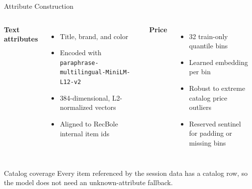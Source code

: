 \documentclass[10pt,aspectratio=169]{beamer}
\newcommand{\code}[1]{\texttt{#1}}
\begin{document}
\begin{frame}{Attribute Construction}
  \begin{columns}[T,onlytextwidth]
      \textbf{Text attributes}
      \begin{itemize}
        \item Title, brand, and color
        \item Encoded with \code{paraphrase-multilingual-MiniLM-L12-v2}
        \item 384-dimensional, L2-normalized vectors
        \item Aligned to RecBole internal item ids
      \end{itemize}

      \textbf{Price}
      \begin{itemize}
        \item 32 train-only quantile bins
        \item Learned embedding per bin
        \item Robust to extreme catalog price outliers
        \item Reserved sentinel for padding or missing bins
      \end{itemize}
  \end{columns}

  \vspace{0.8em}
  \begin{block}{Catalog coverage}
    Every item referenced by the session data has a catalog row, so the model does not need an unknown-attribute fallback.
  \end{block}
\end{frame}
\end{document}
